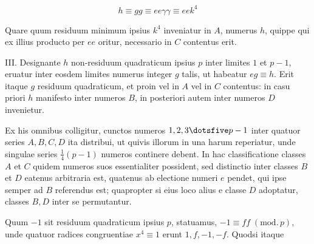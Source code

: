 \[
h\equiv gg\equiv ee\gamma\gamma\equiv eek^4
\]

Quare quum residuum minimum ipsius $k^4$ inveniatur in $A$, numerus $h$, quippe qui ex illius producto per $ee$ oritur, necessario in $C$ contentus erit.

III. Designante $h$ non-residuum quadraticum ipsius $p$ inter limites $1$ et $p-1$, eruatur inter eosdem limites numerus integer $g$ talis, ut habeatur $eg\equiv h$. Erit itaque $g$ residuum quadraticum, et proin vel in $A$ vel in $C$ contentus: in casu priori $h$ manifesto inter numeros $B$, in posteriori autem inter numeros $D$ invenietur.

Ex his omnibus colligitur, cunctos numeros $1,2,3\dotsfive p-1$ inter quatuor series $A,B,C,D$ ita distribui, ut quivis illorum in una harum reperiatur, unde singulae series $\tfrac14(p-1)$ numeros continere debent. In hac classificatione classes $A$ et $C$ quidem numeros suos essentialiter possident, sed distinctio inter classes $B$ et $D$ eatenus arbitraria est, quatenus ab electione numeri $e$ pendet, qui ipse semper ad $B$ referendus est; quapropter si eius loco alius e classe $D$ adoptatur, classes $B,D$ inter se permutantur.

Quum $-1$ sit residuum quadraticum ipsius $p$, statuamus, $-1\equiv ff\; (\mathrm{mod.}\,p)$, unde quatuor radices congruentiae $x^4\equiv1$ erunt $1,f,-1,-f$. Quodsi itaque\space%
